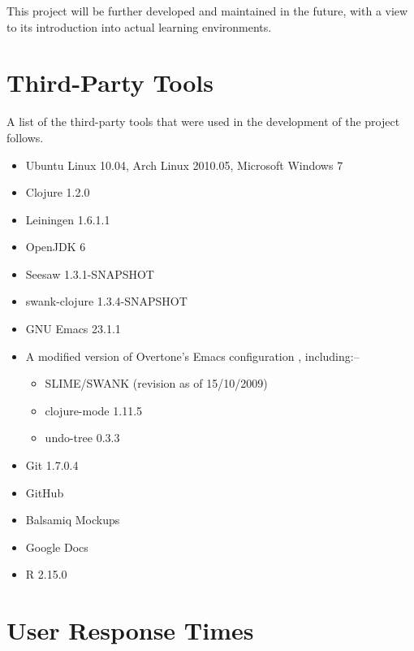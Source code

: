 \documentclass[12pt,twoside,notitlepage,xetex]{report}
\begin{document}
This project will be further developed and maintained in the future, with a view to its introduction into actual learning environments.




\cleardoublepage



\cleardoublepage

\appendix

\chapter{Third-Party Tools}

A list of the third-party tools that were used in the development of the project follows.

\begin{itemize}
\item Ubuntu Linux 10.04, Arch Linux 2010.05, Microsoft Windows 7
\item Clojure 1.2.0
\item Leiningen 1.6.1.1
\item OpenJDK 6
\item Seesaw 1.3.1-SNAPSHOT
\item swank-clojure 1.3.4-SNAPSHOT
\item GNU Emacs 23.1.1
\item A modified version of Overtone's Emacs configuration \cite{OvertoneEmacsD}, including:--
\begin{itemize}
\item SLIME/SWANK (revision as of 15/10/2009)
\item clojure-mode 1.11.5
\item undo-tree 0.3.3
\end{itemize}
\item Git 1.7.0.4
\item GitHub
\item Balsamiq Mockups
\item Google Docs
\item R 2.15.0
\end{itemize}

\chapter{User Response Times}
\end{document}
